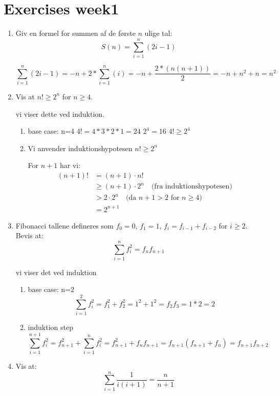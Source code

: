 \documentclass{article}
\theoremstyle{definition}
\begin{document}
\section{Exercises week1}

\begin{enumerate}
    \item Giv en formel for summen af de første $n$ ulige tal:
    \[ S(n) = \sum_{i=1}^n (2i-1) \]

    \[
    \sum_{i=1}^n (2i-1) = -n + 2*\sum_{i=1}^n (i) = -n + \frac{2*(n(n+1))}{2} = -n + n^2 + n = n^2
    \]

    \item Vis at $n! \geq 2^n$ for $n \geq 4$.
    
    vi viser dette ved induktion.
    \begin{enumerate}
        \item base case: n=4
        $4! = 4*3*2*1=24$
        $2^4 = 16$
        $4! \geq 2^4$

        \item Vi anvender induktionshypotesen $n! \geq 2^n$
        
        For $n+1$ har vi:
        \begin{align*}
            (n+1)! &= (n+1) \cdot n! \\
            &\geq (n+1) \cdot 2^n \quad \text{(fra induktionshypotesen)} \\
            &> 2 \cdot 2^n \quad \text{(da $n+1 > 2$ for $n \geq 4$)} \\
            &= 2^{n+1}
        \end{align*}
    \end{enumerate}

    \item Fibonacci tallene defineres som $f_0 = 0$, $f_1 = 1$, $f_i = f_{i-1} + f_{i-2}$ for $i \geq 2$. Bevis at:
    \[ \sum_{i=1}^n f_i^2 = f_n f_{n+1} \]

    vi viser det ved induktion
    \begin{enumerate}
        \item base case: n=2
        \[ \sum_{i=1}^2 f_i^2 = f_1^2 + f_2^2 = 1^2 + 1^2 = f_2 f_{3} = 1*2 = 2 \]
        \item induktion step
        \[ \sum_{i=1}^{n+1} f_i^2 = f_{n+1}^2 + \sum_{i=1}^n f_i^2 = f_{n+1}^2 + f_n f_{n+1} = f_{n+1}(f_{n+1} + f_{n}) = f_{n+1}f_{n+2}\]
    \end{enumerate}

    \item Vis at:
    \[ \sum_{i=1}^n \frac{1}{i(i+1)} = \frac{n}{n+1} \]


\end{enumerate}
\end{document}
